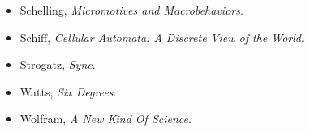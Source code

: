 \documentclass[12pt]{book}
\theoremstyle{exercise}
\newcommand\blankpage{%
    \null
    \thispagestyle{empty}%
    \addtocounter{page}{-1}%
    \newpage}
\begin{document}
\begin{itemize}
\item Schelling, {\it  Micromotives and Macrobehaviors}.

\item Schiff, {\it  Cellular Automata: A Discrete View of the World}.

\item Strogatz, {\it  Sync}.

\item Watts, {\it  Six Degrees}.

\item Wolfram, {\it  A New Kind Of Science}.

\end{itemize}



\backmatter
\printindex

\afterpage{\blankpage}
\end{document}
